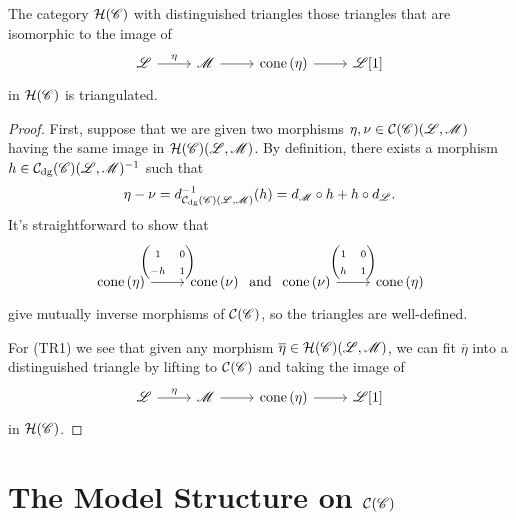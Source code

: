 \documentclass[dissertation.tex]{subfiles}
\begin{document}
\begin{prop}
  The category $\mathcal{H}(\mathscr{C})$ with distinguished triangles those triangles that are isomorphic to the image of
  $$\begin{tikzcd}
    \mathscr{L} \arrow{r}{\eta} & \mathscr{M} \arrow{r} & \cone{\eta} \arrow{r} & \mathscr{L}[1] 
  \end{tikzcd}$$
  in $\mathcal{H}(\mathscr{C})$ is triangulated.

  \begin{proof}
    First, suppose that we are given two morphisms $\eta, \nu \in \mathcal{C}(\mathscr{C})(\mathscr{L},\mathscr{M})$ having the same image in $\mathcal{H}(\mathscr{C})(\mathscr{L},\mathscr{M})$.
    By definition, there exists a morphism $h \in \mathcal{C}_\text{dg}(\mathscr{C})(\mathscr{L},\mathscr{M})^{-1}$ such that 
    $$\eta - \nu = d_{\mathcal{C}_\text{dg}(\mathscr{C})(\mathscr{L},\mathscr{M})}^{-1}(h) = d_\mathscr{M} \circ h + h \circ d_\mathscr{L}.$$
    It's straightforward to show that
    $$\begin{tikzcd}[ampersand replacement=\&]
      \cone{\eta} \arrow{r}{\left(\begin{matrix}1 & 0\\-h & 1\end{matrix}\right)} \& \cone{\nu}
    \end{tikzcd}
    \ \text{and}\ 
    \begin{tikzcd}[ampersand replacement=\&]
      \cone{\nu} \arrow{r}{\left(\begin{matrix}1 & 0\\h & 1\end{matrix}\right)} \& \cone{\eta}
    \end{tikzcd}$$
    give mutually inverse morphisms of $\mathcal{C}(\mathscr{C})$, so the triangles are well-defined.
    
    For (TR1) we see that given any morphism $\overline{\eta} \in \mathcal{H}(\mathscr{C})(\mathscr{L},\mathscr{M})$, we can fit $\overline{\eta}$ into a distinguished triangle by lifting to $\mathcal{C}(\mathscr{C})$ and taking the image of
    $$\begin{tikzcd}
      \mathscr{L} \arrow{r}{\eta} & \mathscr{M} \arrow{r} & \cone{\eta} \arrow{r} & \mathscr{L}[1]
    \end{tikzcd}$$
    in $\mathcal{H}(\mathscr{C})$.
  \end{proof}
\end{prop}
\section{The Model Structure on $\mathcal{C}(\mathscr{C})$}
\end{document}
